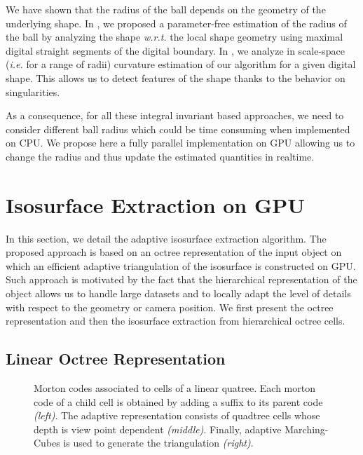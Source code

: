 \documentclass{llncs}
\newcommand{\ie}{\emph{i.e.} }
\newcommand{\wrt}{\emph{w.r.t.} }
\begin{document}
We have shown that the radius of the ball depends on the geometry of
the underlying shape. In \cite{DGCI2014}, we proposed a parameter-free
estimation of the radius of the ball by analyzing the shape \wrt the
local shape geometry using maximal digital straight segments of the
digital boundary. In \cite{SMI2015}, we analyze in scale-space (\ie
for a range of radii) curvature estimation of our algorithm for a
given digital shape. This allows us to detect features of the shape
thanks to the behavior on singularities. 

As a consequence, for all these integral invariant based approaches,
we need to consider different ball radius which could be time
consuming when implemented on CPU. We propose here a fully parallel
implementation on GPU allowing us to change the radius and thus update
the estimated quantities in realtime.

\section{Isosurface Extraction on GPU}
\label{sec:isos-extr-gpu}

In this section, we detail the adaptive isosurface extraction
algorithm. The proposed approach is based on an octree representation
of the input object on which an efficient adaptive triangulation
of the isosurface is constructed on GPU. Such approach is motivated by
the fact that the hierarchical representation of the object allows us
to handle large datasets and to locally adapt the level of details
with respect to the geometry or camera position. We first present the
octree representation and then the isosurface extraction from
hierarchical octree cells.

\subsection{Linear Octree Representation}

\begin{figure}[!htbp]
  \begin{center}
  \end{center}
\caption{Morton codes associated to cells of a linear quatree. Each
   morton code of a child cell is obtained by adding a suffix to its
  parent code \emph{(left)}. The adaptive representation consists of
  quadtree cells whose depth is view point dependent
  \emph{(middle)}. Finally, adaptive Marching-Cubes is used to
  generate the triangulation \emph{(right)}.}
\label{fig_quadtree_partitionning}
\end{figure}
\end{document}

